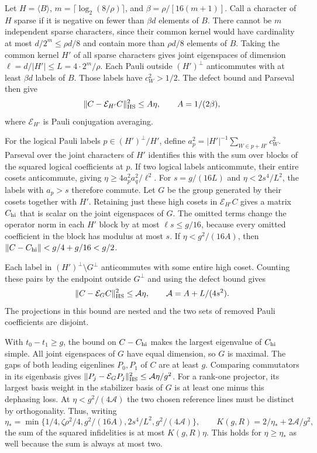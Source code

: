 Let \(H=\langle B\rangle\),
\(m=\lceil\log_2(8/\rho)\rceil\), and \(\beta=\rho/[16(m+1)]\).
Call a character of \(H\) sparse if it is negative on fewer
than \(\beta d\) elements of \(B\). There cannot be \(m\)
independent sparse characters, since their common kernel
would have cardinality at most \(d/2^m\le\rho d/8\) and
contain more than \(\rho d/8\) elements of \(B\).
Taking the common kernel \(H'\) of all sparse characters
gives joint eigenspaces of dimension
\(\ell=d/|H'|\le L=4\cdot2^m/\rho\). Each Pauli outside
\((H')^\perp\) anticommutes with at least \(\beta d\) labels
of \(B\). Those labels have \(c_W^2>1/2\). The defect bound
and Parseval then give
\[
 \|C-\mathcal E_{H'}C\|_{\rm HS}^2\le A\eta,\qquad
 A=1/(2\beta),
\]
where \(\mathcal E_{H'}\) is Pauli conjugation averaging.

For the logical Pauli labels \(p\in (H')^\perp/H'\), define
\(a_p^2=|H'|^{-1}\sum_{W\in p+H'}c_W^2\).
Parseval over the joint characters of \(H'\) identifies this
with the sum over blocks of the squared logical coefficients
at \(p\). If two logical labels anticommute, their entire
cosets anticommute, giving \(\eta\ge4a_p^2a_q^2/\ell^2\).
For \(s=g/(16L)\) and \(\eta<2s^4/L^2\), the labels with
\(a_p>s\) therefore commute. Let \(G\) be the group generated
by their cosets together with \(H'\). Retaining just these high
cosets in \(\mathcal E_{H'}C\) gives a matrix \(C_{\rm hi}\)
that is scalar on the joint eigenspaces of \(G\). The omitted
terms change the operator norm in each \(H'\) block by at
most \(\ell s\le g/16\), because every omitted coefficient
in the block has modulus at most \(s\). If
\(\eta<g^2/(16A)\), then
\(\|C-C_{\rm hi}\|<g/4+g/16<g/2\).

Each label in \((H')^\perp\setminus G^\perp\)
anticommutes with some entire high coset. Counting these
pairs by the endpoint outside \(G^\perp\) and using the defect bound
gives
\[
 \|C-\mathcal E_G C\|_{\rm HS}^2
 \le \mathcal A\eta,\qquad
 \mathcal A=A+L/(4s^2).
\]
The projections in this bound are nested and the two sets of
removed Pauli coefficients are disjoint.

With \(t_0-t_1\ge g\), the bound on \(C-C_{\rm hi}\) makes the
largest eigenvalue of \(C_{\rm hi}\) simple. All joint
eigenspaces of \(G\) have equal dimension, so \(G\) is maximal.
The gaps of both leading eigenlines \(P_0,P_1\) of \(C\) are
at least \(g\). Comparing commutators in its eigenbasis gives
\(\|P_j-\mathcal E_GP_j\|_{\rm HS}^2\le\mathcal A\eta/g^2\).
For a rank-one projector, its largest basis weight in the
stabilizer basis of \(G\) is at least one minus this
dephasing loss. At \(\eta<g^2/(4\mathcal A)\) the two chosen
reference lines must be distinct by orthogonality. Thus,
writing
\[
 \eta_*=\min\{1/4,\zeta\rho^2/4,g^2/(16A),2s^4/L^2,
                           g^2/(4\mathcal A)\},
 \qquad
 K(g,R)=2/\eta_*+2\mathcal A/g^2,
\]
the sum of the squared infidelities is at most \(K(g,R)\eta\).
This holds for \(\eta\ge\eta_*\) as well because the sum is
always at most two.

